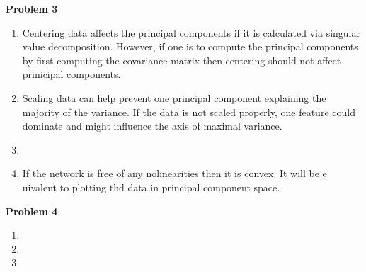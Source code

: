 \documentclass[11pt,letterpaper]{article}
\begin{document}
\textbf{Problem 3}
\begin{enumerate}[labelindent=0pt]
\item 
Centering data affects the principal components if it is calculated via singular
value decomposition.  However, if one is to compute the principal components by
first computing the covariance matrix then centering should not affect
prinicipal components.

\item 
Scaling data can help prevent one principal component explaining the majority of
the variance.  If the data is not scaled properly, one feature could dominate
and might influence the axis of maximal variance. 

\item 
\item 
If the network is free of any nolinearities then it is convex.  
It will be e	uivalent to plotting thd data in principal component space.
\end{enumerate}

\textbf{Problem 4}
\begin{enumerate}[labelindent=0pt]
\item 
\item 
\item 
\end{enumerate}


\noindent
\end{document}
